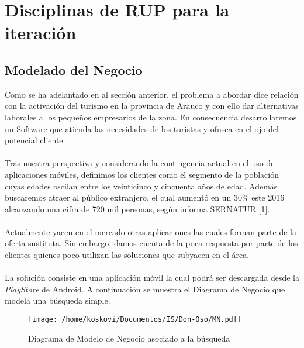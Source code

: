\documentclass[12pt]{article}
\begin{document}
\section{Disciplinas de RUP para la iteración}
\subsection{Modelado del Negocio}
Como se ha adelantado en al sección anterior, el problema a abordar dice relación con la activación del turismo en la provincia de Arauco y con ello dar alternativas laborales a los pequeños empresarios de la zona. En consecuencia desarrollaremos un Software que atienda las necesidades de los turistas y ofusca  en el ojo del potencial cliente.\\\\Tras nuestra perspectiva y considerando la contingencia actual en el uso de aplicaciones móviles, definimos los clientes como el segmento de la población cuyas edades oscilan entre los veinticinco y cincuenta años de edad. Además buscaremos atraer al público extranjero, el cual aumentó en un 30\% este 2016 alcanzando una cifra de 720 mil personas, según informa SERNATUR [1].\\\\Actualmente yacen en el mercado otras aplicaciones las cuales forman parte de la oferta sustituta. Sin embargo, damos cuenta de la poca respuesta por parte de los clientes quienes poco utilizan las soluciones que subyacen en el área.\\\\La solución consiste en una aplicación móvil la cual podrá ser descargada desde la \emph{PlayStore} de Android. A continuación se muestra el Diagrama de Negocio que modela una búsqueda simple.
\begin{figure}[htp]
\begin{center}\centering
\texttt{[image: /home/koskovi/Documentos/IS/Don-Oso/MN.pdf]}
\caption{Diagrama de Modelo de Negocio asociado a la búsqueda}
\label{}\end{center}
\end{figure}
\end{document}
